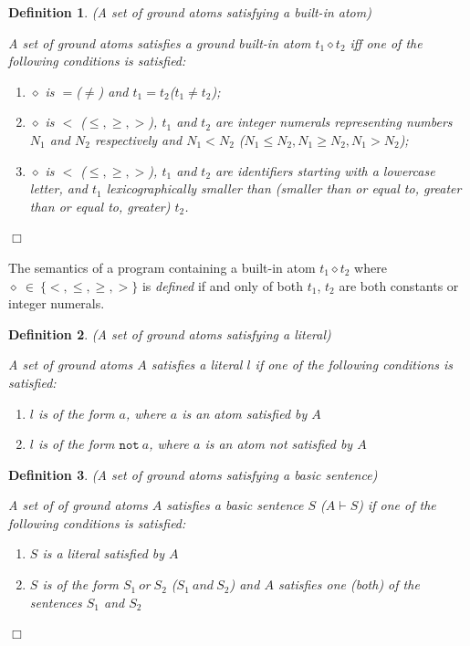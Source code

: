 \documentclass[a4paper,10pt]{article}
\newtheorem{definition}{Definition}
\begin{document}
\begin{definition} (A set of ground atoms satisfying a built-in  atom)\\
{\rm
A set of ground atoms satisfies a ground built-in atom $t_1 \diamond t_2$ iff one of the following conditions is satisfied:
\begin{enumerate}
\item $\diamond$ is $=$($\not =$) and $t_1 = t_2$($t_1 \not= t_2$);
\item $\diamond$ is $<$ ($\le,\ge, >$), $t_1$ and $t_2$ are integer numerals representing numbers $N_1$ and $N_2$ respectively and
 $N_1 < N_2$ ($N_1 \le N_2, N_1 \ge N_2, N_1 > N_2$);
\item $\diamond$ is $<$ ($\le,\ge, >$),  $t_1$ and $t_2$ are identifiers starting with a lowercase letter, and $t_1$  lexicographically smaller than (smaller than or equal to, greater than or equal to, greater) $t_2$.
\end{enumerate}
} 


\hfill$\Box$
\end{definition}

\medskip\noindent
The semantics of a program containing a built-in atom $t_1 \diamond t_2$ where $\diamond~\in~\{<, \le, \ge, >\}$ is \textit{defined} if and only of both $t_1$, $t_2$ are both constants or integer numerals.

\begin{definition} (A set of ground atoms satisfying a literal)\\
{\rm
A set of ground atoms $A$ satisfies a literal $l$ if one of the following conditions is satisfied:
\begin{enumerate}
\item $l$ is of the form $a$, where $a$ is an atom satisfied by $A$
\item $l$ is of the form $\texttt{not}~a$, where $a$ is an atom not satisfied by $A$ 
\end{enumerate}
} 
\end{definition}

\begin{definition}(A set of ground atoms satisfying a basic sentence) \\
\rm{
A set of of ground atoms $A$ satisfies a basic sentence $S$ ($A \vdash S$) if one of the following conditions is satisfied:
\begin{enumerate}
\item $S$ is a literal satisfied by $A$
\item $S$ is of the form $S_1~or~S_2$ ($S_1~and~S_2$) and $A$ satisfies one (both) of the sentences  $S_1$ and $S_2$
\end{enumerate}
}

\hfill$\Box$
\end{definition}
\end{document}
